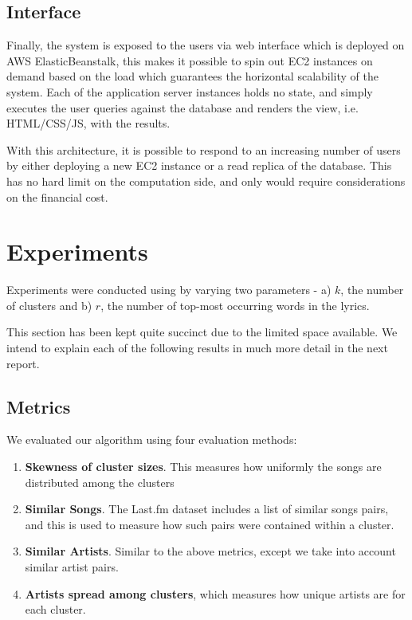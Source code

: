 \documentclass[10pt,a4paper, twocolumn]{article}
\begin{document}
  \subsection{Interface}
  
  Finally, the system is exposed to the users via web interface which is deployed
  on AWS ElasticBeanstalk, this makes it possible to spin out EC2 instances on
  demand based on the load which guarantees the horizontal scalability of
  the system. Each of the application server instances holds no state, and simply
  executes the user queries against the database and renders the view, i.e.
  HTML/CSS/JS, with the results.
  
  With this architecture, it is possible to respond to an increasing number of
  users by either deploying a new EC2 instance or a read replica of the
  database. This has no hard limit on the computation side, and only
  would require considerations on the financial cost.
  
  \section{Experiments}
  Experiments were conducted using by varying two parameters - a) $k$, the number
  of clusters and b) $r$, the number of top-most occurring words in the lyrics.
  
  This section has been kept quite succinct due to the limited space available.
  We intend to explain each of the following results in much more detail in the next report.
  
  \subsection{Metrics}
  We evaluated our algorithm using four evaluation methods:
  \begin{enumerate}
  \item \textbf{Skewness of cluster sizes}. This measures how uniformly the songs are distributed among the clusters
  \item \textbf{Similar Songs}. The Last.fm dataset includes a list of similar songs pairs, and this is used to measure how such pairs were contained within a cluster.
  \item \textbf{Similar Artists}. Similar to the above metrics, except we take into account similar artist pairs.
  \item \textbf{Artists spread among clusters}, which measures how unique artists are for each cluster.
  \end{enumerate}
    
\end{document}
